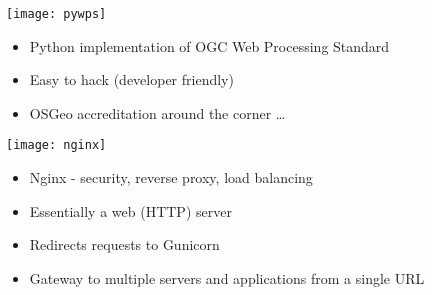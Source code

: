 \documentclass[portrait,a0paper,fontscale=0.4]{baposter} %
\newcommand{\compresslist}{%
\setlength{\itemsep}{1pt}%
\setlength{\parskip}{0pt}%
\setlength{\parsep}{0pt}%
}
\begin{document}
\begin{poster}
{\begin{multicols}{2}
\begin{minipage}{0.5\textwidth}
    \begin{minipage}{0.2\textwidth}
      \texttt{[image: pywps]}
    \end{minipage}
    \begin{minipage}{0.8\textwidth}
      \begin{itemize}\compresslist
        \item Python implementation of OGC Web Processing Standard
        \item Easy to hack (developer friendly)
        \item OSGeo accreditation around the corner \ldots
      \end{itemize}
    \end{minipage}

    \begin{minipage}{0.2\textwidth}
      \texttt{[image: nginx]}
    \end{minipage}
    \begin{minipage}{0.8\textwidth}
      \begin{itemize}\compresslist
        \item Nginx - security, reverse proxy, load balancing
        \item Essentially a web (HTTP) server
        \item Redirects requests to Gunicorn
        \item Gateway to multiple servers and applications from a single URL
      \end{itemize}
    \end{minipage}


\end{minipage}
\end{multicols}}
\end{poster}
\end{document}
